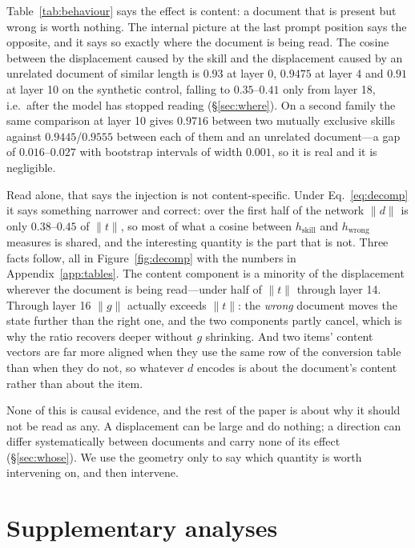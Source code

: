 \documentclass{article}
\newcommand{\dvec}{\ensuremath{d}}
\newcommand{\gvec}{\ensuremath{g}}
\newcommand{\tvec}{\ensuremath{t}}
\begin{document}
Table~\ref{tab:behaviour} says the effect is content: a document that is present
but wrong is worth nothing. The internal picture at the last prompt position says
the opposite, and it says so exactly where the document is being read. The cosine
between the displacement caused by the skill and the displacement caused by an
unrelated document of similar length is $0.93$ at layer 0, $0.9475$ at layer 4
and $0.91$ at layer 10 on the synthetic control, falling to $0.35$--$0.41$ only
from layer 18, i.e.\ after the model has stopped reading (\S\ref{sec:where}). On
a second family the same comparison at layer 10 gives $0.9716$ between two
mutually exclusive skills against $0.9445$/$0.9555$ between each of them and an
unrelated document---a gap of $0.016$--$0.027$ with bootstrap intervals of width
$0.001$, so it is real and it is negligible.

Read alone, that says the injection is not content-specific. Under
Eq.~\ref{eq:decomp} it says something narrower and correct: over the first half
of the network $\|\dvec\|$ is only $0.38$--$0.45$ of $\|\tvec\|$, so most of what
a cosine between $h_{\text{skill}}$ and $h_{\text{wrong}}$ measures is shared,
and the interesting quantity is the part that is not. Three facts follow, all in
Figure~\ref{fig:decomp} with the numbers in Appendix~\ref{app:tables}. The
content component is a minority of the displacement wherever the document is
being read---under half of $\|\tvec\|$ through layer 14. Through layer 16
$\|\gvec\|$ actually exceeds $\|\tvec\|$: the \emph{wrong} document moves the
state further than the right one, and the two components partly cancel, which is
why the ratio recovers deeper without $\gvec$ shrinking. And two items' content
vectors are far more aligned when they use the same row of the conversion table
than when they do not, so whatever $\dvec$ encodes is about the document's
content rather than about the item.



None of this is causal evidence, and the rest of the paper is about why it
should not be read as any. A displacement can be large and do nothing; a
direction can differ systematically between documents and carry none of its
effect (\S\ref{sec:whose}). We use the geometry only to say which quantity is worth
intervening on, and then intervene.


\clearpage

\section{Supplementary analyses}
\label{app:moved}
\end{document}
